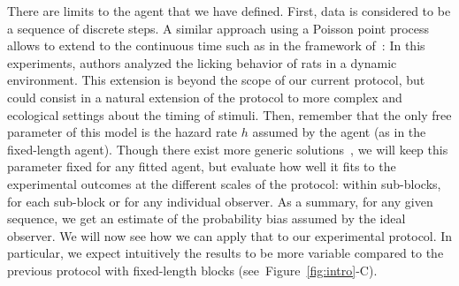 \documentclass[12pt,english]{article}%
\newcommand{\citep}[1]{\parencite{#1}}
\newcommand{\citet}[1]{\textcite{#1}}
\newcommand{\seeFig}[1]{Figure~\ref{fig:#1}}
\begin{document}
There are limits to the agent that we have defined.
First, data is considered to be a sequence of discrete steps.
A similar approach using a Poisson point process 
allows to extend to the continuous time
such as in the framework of~\citet{RadilloBrady2017}:
In this experiments, authors analyzed the licking behavior of rats in a dynamic environment.
This extension is beyond the scope of our current protocol,
but could consist in a natural extension of the protocol
to more complex and ecological settings about the timing of stimuli.
Then, remember that the only free parameter of this model is the hazard rate $h$
assumed by the agent (as in the fixed-length agent).
Though there exist more generic solutions~\citep{Wilson13,Wilson18},
we will keep this parameter fixed for any fitted agent, but evaluate
how well it fits to the experimental outcomes at the different scales of the protocol:
within sub-blocks, for each sub-block or for any individual observer.
As a summary, for any given sequence,
we get an estimate of the probability bias assumed by the ideal observer.
We will now see how we can apply that to our experimental protocol.
In particular, we expect intuitively the results to be more variable
compared to the previous protocol with fixed-length blocks (see~\seeFig{intro}-C).
\end{document}
